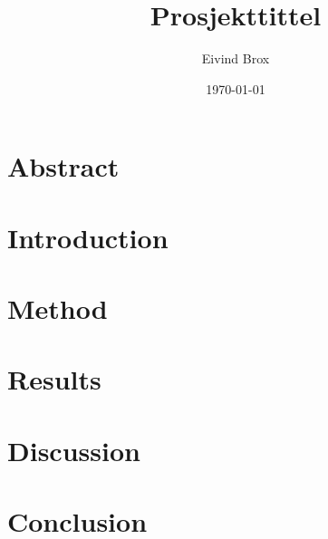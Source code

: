 \documentclass[11pt, a4paper]{article}
\author{Eivind Brox}
\title{Prosjekttittel}
\date{\today}
\begin{document}
\maketitle
\thispagestyle{empty}
\clearpage	

\section{Abstract}



\clearpage
\pagestyle{headings}		
\tableofcontents		
\clearpage
{}		

\section{Introduction}
\clearpage
\section{Method}

\clearpage

\section{Results}


\clearpage
\section{Discussion}

\clearpage
\section{Conclusion}
\appendix


% 
\end{document}
